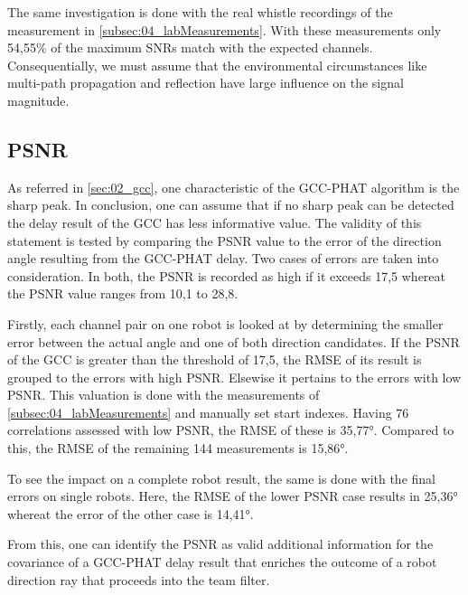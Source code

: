The same investigation is done with the real whistle recordings of the
measurement in \ref{subsec:04_labMeasurements}.
With these measurements only 54,55\si{\percent} of the maximum \acp{SNR}
match with the expected channels.
Consequentially, we must assume that the environmental circumstances
like multi-path propagation and reflection have large influence
on the signal magnitude.

\subsection{PSNR}
\label{subsec:04_psnr}

As referred in \cref{sec:02_gcc}, one characteristic of the \ac{GCC-PHAT}
algorithm is the sharp peak.
In conclusion, one can assume that if no sharp peak can be detected the
delay result of the \ac{GCC} has less informative value.
The validity of this statement is tested by comparing the \ac{PSNR} value
to the error of the direction angle resulting from the \ac{GCC-PHAT} delay.
Two cases of errors are taken into consideration.
In both, the \ac{PSNR} is recorded as high if it exceeds 17,5 whereat the
\ac{PSNR} value ranges from 10,1 to 28,8.

Firstly, each channel pair on one robot is looked at by determining the
smaller error between the actual angle and one of both direction candidates.
If the \ac{PSNR} of the \ac{GCC} is greater than the threshold of 17,5,
the \ac{RMSE} of its result is grouped to the errors with high \ac{PSNR}.
Elsewise it pertains to the errors with low \ac{PSNR}.
This valuation is done with the measurements of \cref{subsec:04_labMeasurements}
and manually set start indexes.
Having 76 correlations assessed with low \ac{PSNR}, the \ac{RMSE} of these
is 35,77\si{\degree}.
Compared to this, the \ac{RMSE} of the remaining 144 measurements
is 15,86\si{\degree}.

To see the impact on a complete robot result, the same is done
with the final errors on single robots.
Here, the \ac{RMSE} of the lower \ac{PSNR} case results in 25,36\si{\degree}
whereat the error of the other case is 14,41\si{\degree}.

From this, one can identify the \ac{PSNR} as valid additional information
for the covariance of a \ac{GCC-PHAT} delay result that enriches the
outcome of a robot direction ray that proceeds into the team filter.

